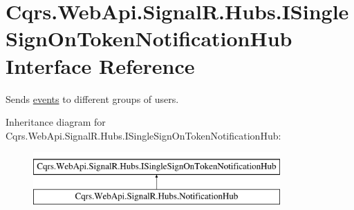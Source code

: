\hypertarget{interfaceCqrs_1_1WebApi_1_1SignalR_1_1Hubs_1_1ISingleSignOnTokenNotificationHub}{}\section{Cqrs.\+Web\+Api.\+Signal\+R.\+Hubs.\+I\+Single\+Sign\+On\+Token\+Notification\+Hub Interface Reference}
\label{interfaceCqrs_1_1WebApi_1_1SignalR_1_1Hubs_1_1ISingleSignOnTokenNotificationHub}


Sends \hyperlink{}{events} to different groups of users.  


Inheritance diagram for Cqrs.\+Web\+Api.\+Signal\+R.\+Hubs.\+I\+Single\+Sign\+On\+Token\+Notification\+Hub\+:\begin{figure}[H]
\begin{center}
\leavevmode
\includegraphics[height=2.000000cm]{interfaceCqrs_1_1WebApi_1_1SignalR_1_1Hubs_1_1ISingleSignOnTokenNotificationHub}
\end{center}
\end{figure}

